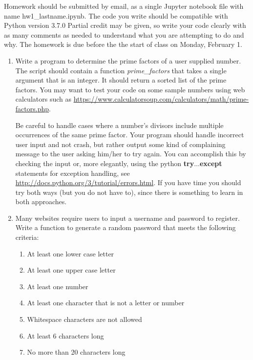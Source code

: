 \documentclass[12pt]{article}
\begin{document}
\maketitle

Homework should be submitted by email, as a single Jupyter notebook file with name hw1\_lastname.ipynb.  
The code you write should be compatible with Python version 3.7.0  
Partial credit may be given, so write your code clearly with as many comments as needed to understand what you are attempting to do and why.
The homework is due before the the start of class on Monday, February 1. 

\begin{enumerate}
	\item Write a program to determine the prime factors of a user supplied number.  The script should contain a function \textit{prime\_factors} that takes a single argument that is an integer.  It should return a sorted list of the prime factors.  You may want to test your code on some sample numbers using web calculators such as \url{https://www.calculatorsoup.com/calculators/math/prime-factors.php}.

Be careful to handle cases where a number's divisors include multiple occurrences of the same prime factor.  Your program should handle incorrect user input and not crash, but rather output some kind of complaining message to the user asking him/her to try again.  You can accomplish this by checking the input or, more elegantly, using the python \textbf{try}$\ldots$\textbf{except} statements for exception handling, see \url{http://docs.python.org/3/tutorial/errors.html}.  If you have time you should try both ways (but you do not have to), since there is something to learn in both approaches.

    \item Many websites require users to input a username and password to register. Write a function to generate a random password that meets the following criteria:
    	\begin{enumerate}
		\item At least one lower case letter
		\item At least one upper case letter
		\item At least one number
		\item At least one character that is not a letter or number
		\item Whitespace characters are not allowed
		\item At least 6 characters long
		\item No more than 20 characters long
	\end{enumerate}


\end{enumerate}
\end{document}
